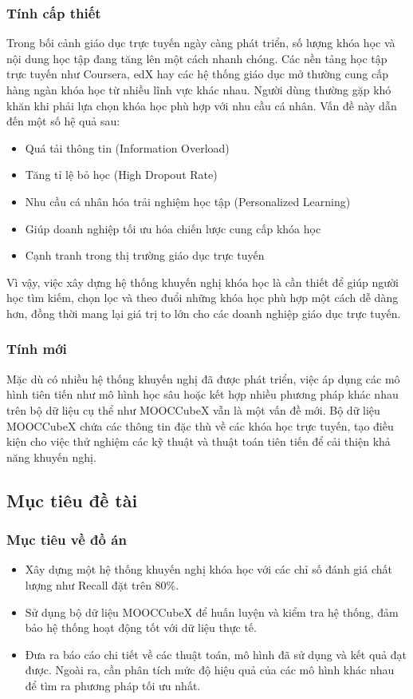 \subsubsection{Tính cấp thiết}
Trong bối cảnh giáo dục trực tuyến ngày càng phát triển, số lượng khóa học và nội dung học tập đang tăng lên một cách nhanh chóng. Các nền tảng học tập trực tuyến như Coursera, edX hay các hệ thống giáo dục mở thường cung cấp hàng ngàn khóa học từ nhiều lĩnh vực khác nhau. Người dùng thường gặp khó khăn khi phải lựa chọn khóa học phù hợp với nhu cầu cá nhân. Vấn đề này dẫn đến một số hệ quả sau:
\begin{itemize}
    \item Quá tải thông tin (Information Overload)
    \item Tăng tỉ lệ bỏ học (High Dropout Rate)
    \item Nhu cầu cá nhân hóa trải nghiệm học tập (Personalized Learning)
    \item Giúp doanh nghiệp tối ưu hóa chiến lược cung cấp khóa học
    \item Cạnh tranh trong thị trường giáo dục trực tuyến
\end{itemize}
Vì vậy, việc xây dựng hệ thống khuyến nghị khóa học là cần thiết để giúp người học tìm kiếm, chọn lọc và theo đuổi những khóa học phù hợp một cách dễ dàng hơn, đồng thời mang lại giá trị to lớn cho các doanh nghiệp giáo dục trực tuyến.
\subsubsection{Tính mới}
Mặc dù có nhiều hệ thống khuyến nghị đã được phát triển, việc áp dụng các mô hình tiên tiến như mô hình học sâu hoặc kết hợp nhiều phương pháp khác nhau trên bộ dữ liệu cụ thể như MOOCCubeX vẫn là một vấn đề mới. Bộ dữ liệu MOOCCubeX chứa các thông tin đặc thù về các khóa học trực tuyến, tạo điều kiện cho việc thử nghiệm các kỹ thuật và thuật toán tiên tiến để cải thiện khả năng khuyến nghị.
\subsection{Mục tiêu đề tài}
\subsubsection{Mục tiêu về đồ án}
\begin{itemize}
    \item Xây dựng một hệ thống khuyến nghị khóa học với các chỉ số đánh giá chất lượng như Recall đặt trên 80\%.
    \item Sử dụng bộ dữ liệu MOOCCubeX để huấn luyện và kiểm tra hệ thống, đảm bảo hệ thống hoạt động tốt với dữ liệu thực tế.
    \item Đưa ra báo cáo chi tiết về các thuật toán, mô hình đã sử dụng và kết quả đạt được. Ngoài ra, cần phân tích mức độ hiệu quả của các mô hình khác nhau để tìm ra phương pháp tối ưu nhất.
\end{itemize}
